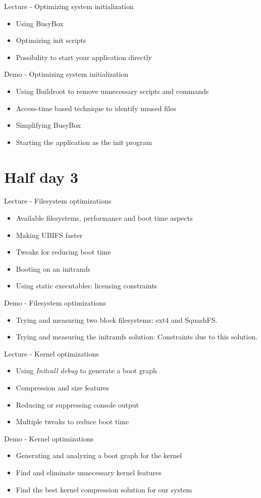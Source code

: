 \documentclass[a4paper,12pt,obeyspaces,spaces,hyphens]{article}
\begin{document}
\feagendatwocolumn
{Lecture - Optimizing system initialization}
{
  \begin{itemize}
  \item Using BusyBox 
  \item Optimizing init scripts
  \item Possibility to start your application directly
  \end{itemize}
}
{Demo - Optimizing system initialization}
{
 \begin{itemize}
 \item Using Buildroot to remove unnecessary scripts and commands
 \item Access-time based technique to identify  unused files
 \item Simplifying BusyBox
 \item Starting the application as the init program
 \end{itemize}
}

\section{Half day 3}

\feagendatwocolumn
{Lecture - Filesystem optimizations}
{
  \begin{itemize}
  \item Available filesystems, performance and boot time aspects
  \item Making UBIFS faster
  \item Tweaks for reducing boot time
  \item Booting on an initramfs
  \item Using static executables: licensing constraints
  \end{itemize}
}
{Demo - Filesystem optimizations}
{
 \begin{itemize}
 \item Trying and measuring two block filesystems: ext4 and SquashFS.
 \item Trying and measuring the initramfs solution. Constraints
       due to this solution.
 \end{itemize}
}

\feagendatwocolumn
{Lecture - Kernel optimizations}
{
  \begin{itemize}
  \item Using {\em Initcall debug} to generate a boot graph
  \item Compression and size features
  \item Reducing or suppressing console output
  \item Multiple tweaks to reduce boot time
  \end{itemize}
}
{Demo - Kernel optimizations}
{
 \begin{itemize}
 \item Generating and analyzing a boot graph for the kernel
 \item Find and eliminate unnecessary kernel features
 \item Find the best kernel compression solution for our system
 \end{itemize}
}
\end{document}
